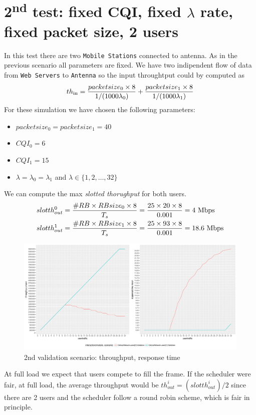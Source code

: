 \section{2\textsuperscript{nd} test: fixed CQI, fixed \(\lambda\) rate, fixed packet size, 2 users}
In this test there are two \texttt{Mobile Stations} connected to antenna. As in the previous scenario all parameters are fixed. We have two indipendent flow of data from \texttt{Web Servers} to \texttt{Antenna} so the input throughtput could by computed as
\begin{equation} 
th\textsubscript{in} = \frac{packetsize\textsubscript{0} \times 8}{1/(1000\lambda\textsubscript{0})} + \frac{packetsize\textsubscript{1} \times 8}{1/(1000\lambda\textsubscript{1})}
\end{equation}
For these simulation we have chosen the following parameters:
\begin{itemize}
	\item \(packetsize_{0} = packetsize_{1} = 40\)
	\item \(CQI_{0} = 6\)
	\item \(CQI_{1} = 15\)
	\item \(\lambda = \lambda_{0} = \lambda_{1}\) and \(\lambda \in \{1,2,\ldots,32\}\)
\end{itemize}
We can compute the max \textit{slotted thorughput} for both users.
\begin{equation}
	\begin{split}
	slotth^{0}_{out} &= \frac{\#RB \times RBsize_{0} \times 8 }{T_s} = \frac{25 \times 20 \times 8}{0.001} = 4 \textnormal{ Mbps} \\ 
	slotth^{1}_{out} &= \frac{\#RB \times RBsize_{1} \times 8 }{T_s} = \frac{25 \times 93 \times 8}{0.001} = 18.6 \textnormal{ Mbps}
	\end{split}
\end{equation} 
\begin{figure}[H]
  \includegraphics[width=1\textwidth]{images/plotvalidation2}
  \caption{2nd validation scenario: throughput, response time}
  \label{fig:2nd validation scenario: throughput, response time}
\end{figure}
At full load we expect that users compete to fill the frame. If the scheduler were fair, at full load, the average throughput would be \(th^{i}_{out} = (slotth^{i}_{out})/2\) since there are 2 users and the scheduler follow a round robin scheme, which is fair in principle. 

